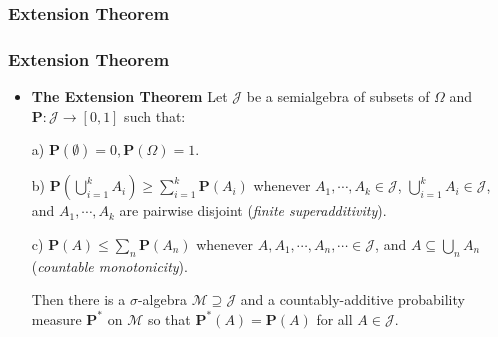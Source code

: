 \documentclass[%
]{beamer}
\newcommand{\BP}{\mathbf{P}}
\begin{document}
\subsubsection{Extension Theorem}
\frame
{
  \frametitle{Extension Theorem}

   \begin{itemize}

             \item<1-> [] \begin{Theorem} \textbf{The Extension Theorem}  Let $\mathcal{J}$ be a semialgebra of subsets of $\Omega$ and $\mathbf{P} : \mathcal{J} \to [0,1]$ such that:
             \newline
             
             a) $\mathbf{P} (\emptyset)=0, \mathbf{P}(\Omega)=1$.
                 \newline
         
             b) $\BP(\bigcup_{i=1}^k A_i)\geq \sum_{i=1}^k \BP(A_i)$ whenever $A_1,\cdots,A_k \in\mathcal{J}$, $\bigcup_{i=1}^k A_i  \in\mathcal{J}$, and $A_1,\cdots,A_k$ are pairwise disjoint (\textit{finite superadditivity}).
                   \newline
       
             c) $\BP(A)\leq \sum_{n} \BP(A_n)$ whenever $A,A_1,\cdots,A_n,\cdots \in\mathcal{J}$, and $A\subseteq \bigcup_{n} A_n$ (\textit{countable monotonicity}).               
             \newline
             
             Then there is a $\sigma$-algebra $\mathcal{M} \supseteq \mathcal{J}$ and a countably-additive probability measure $\BP^*$ on $\mathcal{M}$ so that $\BP^*(A)=\BP(A)$ for all $A\in \mathcal{J}$.
             \end{Theorem}    
       
                
                 \end{itemize}
}
\end{document}
